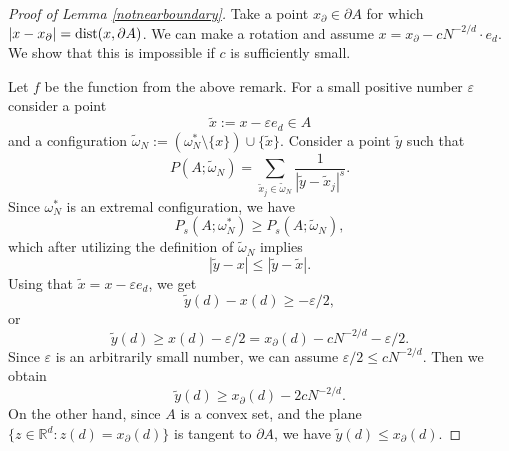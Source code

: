 \documentclass[12pt]{amsart}
\theoremstyle{definition}
\def\sli{\sum\limits}
\def\R{\mathbb{R}}
\def\ep{\varepsilon}
\newcommand{\1}{\mathbf{1}}
\begin{document}
\begin{proof}[Proof of Lemma \ref{notnearboundary}]
Take a point $x_\partial\in \partial A$ for which $|x-x_\partial|=\textup{dist}(x, \partial A)$. We can make a rotation and assume $x=x_\partial - cN^{-2/d}\cdot e_{d}$. We show that this is impossible if $c$ is sufficiently small.

Let $f$ be the function from the above remark. For a small positive number $\ep$ consider a point
$$
\tilde{x}:=x-\ep e_d \in A
$$
and a configuration $\widetilde{\omega}_N:=(\omega^*_N\setminus \{x\})\cup \{\tilde{x}\}$. Consider a point $\tilde{y}$ such that
$$
P(A; \widetilde{\omega}_N) = \sli_{\tilde{x}_j\in \widetilde{\omega}_N} \frac{1}{|\tilde{y}-\tilde{x}_j|^s}.
$$
Since $\omega^*_N$ is an extremal configuration, we have
$$
P_s(A; \omega^*_N)\geqslant P_s(A; \widetilde\omega_N),
$$
which after utilizing the definition of $\widetilde\omega_N$ implies
$$
|\tilde{y}-x|\leqslant |\tilde{y}-\tilde{x}|.
$$
Using that $\tilde{x}=x-\ep e_d$, we get
$$
\tilde{y}(d)-x(d)\geqslant -\ep/2, 
$$
or
$$
\tilde{y}(d)\geqslant x(d)-\ep/2 =x_\partial(d)-cN^{-2/d}-\ep/2.
$$
Since $\ep$ is an arbitrarily small number, we can assume $\ep/2 \leqslant cN^{-2/d}$. Then we obtain
$$
\tilde{y}(d)\geqslant x_\partial(d)-2cN^{-2/d}.
$$
On the other hand, since $A$ is a convex set, and the plane $\{z\in \R^d\colon z(d)=x_\partial(d)\}$ is tangent to $\partial A$, we have $\tilde{y}(d)\leqslant x_\partial(d)$. 


\end{proof}
\end{document}
